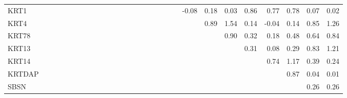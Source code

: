 \begin{longtable}{lrrrrrrrrrrrrrrrrrrrrrrrrrrr}
KRT1    &            &             &            &              &             &              &              &              &           &             &             &              &             &             &             &             &            &            &            &      -0.08 &        0.18 &        0.03 &        0.86 &         0.77 &       0.78 &          0.07 &       0.02 \\
KRT4    &            &             &            &              &             &              &              &              &           &             &             &              &             &             &             &             &            &            &            &            &        0.89 &        1.54 &        0.14 &        -0.04 &       0.14 &          0.85 &       1.26 \\
KRT78   &            &             &            &              &             &              &              &              &           &             &             &              &             &             &             &             &            &            &            &            &             &        0.90 &        0.32 &         0.18 &       0.48 &          0.64 &       0.84 \\
KRT13   &            &             &            &              &             &              &              &              &           &             &             &              &             &             &             &             &            &            &            &            &             &             &        0.31 &         0.08 &       0.29 &          0.83 &       1.21 \\
KRT14   &            &             &            &              &             &              &              &              &           &             &             &              &             &             &             &             &            &            &            &            &             &             &             &         0.74 &       1.17 &          0.39 &       0.24 \\
KRTDAP  &            &             &            &              &             &              &              &              &           &             &             &              &             &             &             &             &            &            &            &            &             &             &             &              &       0.87 &          0.04 &       0.01 \\
SBSN    &            &             &            &              &             &              &              &              &           &             &             &              &             &             &             &             &            &            &            &            &             &             &             &              &            &          0.26 &       0.26 \\

\end{longtable}
